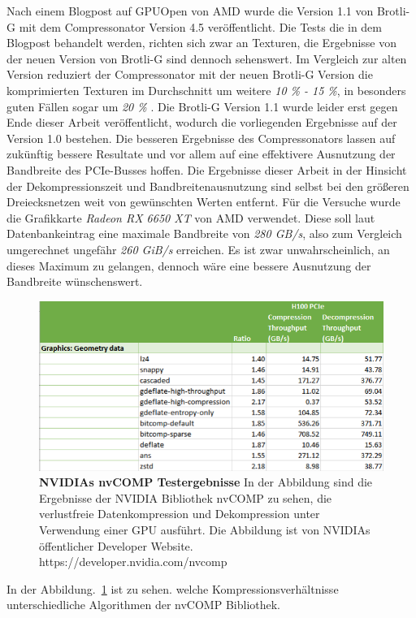 Nach einem Blogpost auf GPUOpen von AMD wurde die Version 1.1 von Brotli-G mit dem Compressonator Version 4.5 veröffentlicht.
Die Tests die in dem Blogpost behandelt werden, richten sich zwar an Texturen, die Ergebnisse von der neuen Version von Brotli-G sind dennoch sehenswert.
Im Vergleich zur alten Version reduziert der Compressonator mit der neuen Brotli-G Version die komprimierten Texturen im Durchschnitt um weitere \textit{10 \% - 15 \%}, in besonders guten Fällen sogar um \textit{20 \%} \cite{Levesque2024}.
Die Brotli-G Version 1.1 wurde leider erst gegen Ende dieser Arbeit veröffentlicht, wodurch die vorliegenden Ergebnisse auf der Version 1.0 bestehen.
Die besseren Ergebnisse des Compressonators lassen auf zukünftig bessere Resultate und vor allem auf eine effektivere Ausnutzung der Bandbreite des PCIe-Busses hoffen.
Die Ergebnisse dieser Arbeit in der Hinsicht der Dekompressionszeit und Bandbreitenausnutzung sind selbst bei den größeren Dreiecksnetzen weit von gewünschten Werten entfernt.
Für die Versuche wurde die Grafikkarte \textit{Radeon RX 6650 XT} von AMD verwendet.
Diese soll laut Datenbankeintrag eine maximale Bandbreite von \textit{280 GB/s}, also zum Vergleich umgerechnet ungefähr \textit{260 GiB/s} erreichen.
Es ist zwar unwahrscheinlich, an dieses Maximum zu gelangen, dennoch wäre eine bessere Ausnutzung der Bandbreite wünschenswert. \newpage
\begin{figure}[htb]
  \centering  
  \includegraphics[scale=0.70]{Bilder/nvComp_geometry_results.png}
  \caption[NVIDIAs nvCOMP Testergebnisse]{\textbf{NVIDIAs nvCOMP Testergebnisse} In der Abbildung sind die Ergebnisse der NVIDIA Bibliothek nvCOMP zu sehen, die verlustfreie Datenkompression und Dekompression unter Verwendung einer GPU ausführt.
  Die Abbildung ist von NVIDIAs öffentlicher Developer Website. https://developer.nvidia.com/nvcomp }
  \label{fig:nvCOMP}
\end{figure}
In der Abbildung.~\ref{fig:nvCOMP} ist zu sehen. welche Kompressionsverhältnisse unterschiedliche Algorithmen der nvCOMP Bibliothek.
